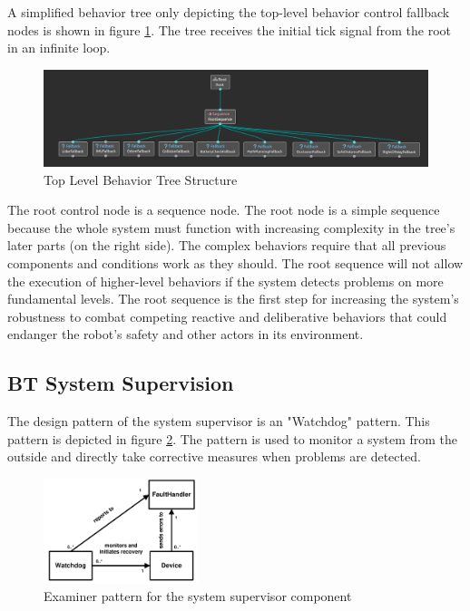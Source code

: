 A simplified behavior tree only depicting the top-level behavior control fallback nodes is shown in figure \ref{fig:top_level_bt}. The tree receives the initial tick signal from the root in an infinite loop. 

\begin{figure}[ht]
	\includegraphics[width=1.0\textwidth]{images/simplified_bt.png}
	\caption{Top Level Behavior Tree Structure}
	\label{fig:top_level_bt}
\end{figure}

The root control node is a sequence node. The root node is a simple sequence because the whole system must function with increasing complexity in the tree's later parts (on the right side). The complex behaviors require that all previous components and conditions work as they should. The root sequence will not allow the execution of higher-level behaviors if the system detects problems on more fundamental levels. The root sequence is the first step for increasing the system's robustness to combat competing reactive and deliberative behaviors that could endanger the robot's safety and other actors in its environment. 

\subsection{BT System Supervision}

The design pattern of the system supervisor is an "Watchdog" pattern. This pattern is depicted in figure \ref{fig:watchdog_pattern}. The pattern is used to monitor a system from the outside and directly take corrective measures when problems are detected. 

\begin{figure}[ht]
	\includegraphics[width=0.4\textwidth]{images/watchdog_pattern.png}
	\caption{Examiner pattern for the system supervisor component \cite{konrad2003defining}}
	\label{fig:watchdog_pattern}
\end{figure}

